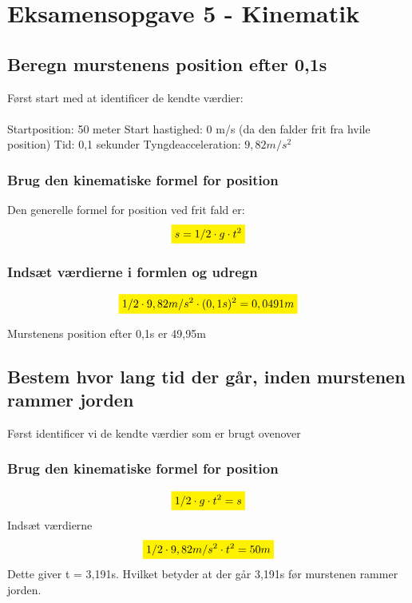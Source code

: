 \newpage
\section{Eksamensopgave 5 - Kinematik}
\subsection{Beregn murstenens position efter 0,1s}
Først start med at identificer de kendte værdier:
\\\\
Startposition: 50 meter \newline
Start hastighed: 0 m/s (da den falder frit fra hvile position)\newline
Tid: 0,1 sekunder \newline
Tyngdeacceleration: \begin{math}9,82m/s^{2}\end{math}


\subsubsection{Brug den kinematiske formel for position}
Den generelle formel for position ved frit fald er:
\begin{equation*}
    \mathcolorbox{yellow}{s=1/2 \cdot g \cdot t^{2}}
\end{equation*}

\subsubsection{Indsæt værdierne i formlen og udregn}
\begin{equation*}
    \mathcolorbox{yellow}{1/2 \cdot 9,82m/s^{2} \cdot (0,1s)^{2}=0,0491m}
\end{equation*}

Murstenens position efter 0,1s er 49,95m

\subsection{Bestem hvor lang tid der går, inden murstenen rammer jorden}

Først identificer vi de kendte værdier som er brugt ovenover

\subsubsection{Brug den kinematiske formel for position}
\begin{equation*}
    \mathcolorbox{yellow}{1/2\cdot g\cdot t^{2}=s}
\end{equation*}
Indsæt værdierne
\begin{equation*}
    \mathcolorbox{yellow}{1/2\cdot9,82m/s^{2}\cdot t^{2}=50m}
\end{equation*}
Dette giver t = 3,191s. Hvilket betyder at der går 3,191s før murstenen rammer jorden.

